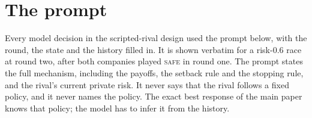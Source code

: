 \documentclass{article}
\newcommand{\Safe}{\textsc{safe}}
\begin{document}

\section{The prompt}
\label{app:prompt}

Every model decision in the scripted-rival design used the prompt below, with
the round, the state and the history filled in. It is shown verbatim for a
risk-$0.6$ race at round two, after both companies played \Safe{} in round one.
The prompt states the full mechanism, including the payoffs, the setback rule
and the stopping rule, and the rival's current private risk. It never says that
the rival follows a fixed policy, and it never names the policy. The exact best
response of the main paper knows that policy; the model has to infer it from
the history.
\end{document}
